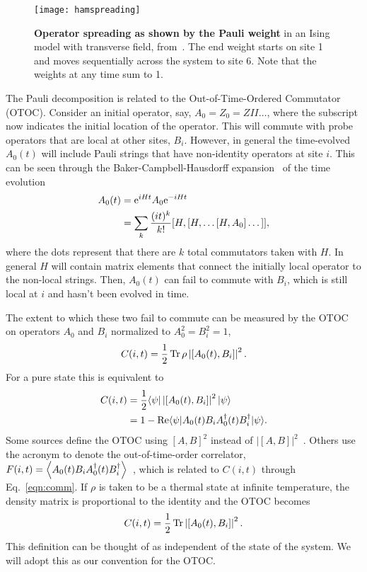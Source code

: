 \begin{figure}
	\centering
	\texttt{[image: hamspreading]}
	\caption{\textbf{Operator spreading as shown by the Pauli weight} in an Ising model with transverse field, from~\cite{Jonay17}. The end weight starts on site 1 and moves sequentially across the system to site 6. Note that the weights at any time sum to 1.}
	\label{fig:hamspreading}
\end{figure}

The Pauli decomposition is related to the Out-of-Time-Ordered Commutator (OTOC). Consider an initial operator, say, $A_0=Z_0=ZII\dots$, where the subscript now indicates the initial location of the operator. This will commute with probe operators that are local at other sites, $B_i$. However, in general the time-evolved $A_0(t)$ will include Pauli strings that have non-identity operators at site $i$. This can be seen through the Baker-Campbell-Hausdorff expansion~\cite{Roberts2016} of the time evolution
\begin{align}
A_0(t) &= \text{e}^{iHt}A_0\text{e}^{-iHt} \nonumber\\
&= \sum_k\frac{(it)^k}{k!}[H,[H,\dots[H,A_0]\dots]],\label{eqn:BCH}
\end{align}
where the dots represent that there are $k$ total commutators taken with $H$.
In general $H$ will contain matrix elements that connect the initially local operator to the non-local strings. Then, $A_0(t)$ can fail to commute with $B_i$, which is still local at $i$ and hasn't been evolved in time.

The extent to which these two fail to commute can be measured by the OTOC on operators $A_0$ and $B_i$ normalized to $A_0^2=B_i^2=1$,
\begin{align}
C(i,t) = \frac{1}{2}\operatorname{Tr} \rho \left|[A_0(t),B_i]\right|^2.\nonumber
\end{align}
For a pure state this is equivalent to~\cite{Keyserlingk, Jonay18}
\begin{align}
C(i,t) &= \frac{1}{2}\langle\psi|\left|[A_0(t),B_i]\right|^2|\psi\rangle\nonumber\\
&= 1-\operatorname{Re}\langle\psi|A_0(t)B_iA_0^\dag(t)B_i^\dag|\psi\rangle. \label{eqn:comm}
\end{align}
Some sources define the OTOC using $[A,B]^2$ instead of $|[A,B]|^2$~\cite{Jonay, Roberts2016, Nahum2017}. Others use the acronym to denote the out-of-time-order correlator, $F(i,t) = \left\langle A_0(t)B_iA_0^\dag(t)B^\dag_i \right\rangle$~\cite{Who}, which is related to $C(i,t)$ through Eq.~\ref{eqn:comm}. If $\rho$ is taken to be a thermal state at infinite temperature, the density matrix is proportional to the identity and the OTOC becomes
\begin{align}
C(i,t) = \frac{1}{2}\operatorname{Tr} \left|[A_0(t),B_i]\right|^2.
\end{align}
This definition can be thought of as independent of the state of the system. We will adopt this as our convention for the OTOC.

